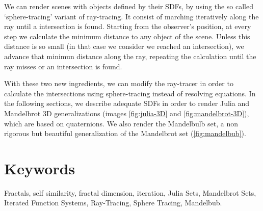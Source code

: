 We can render scenes with objects defined by their SDFs, by using the so called `sphere-tracing' variant of ray-tracing. It consist of marching iteratively along the ray until a intersection is found. Starting from the observer's position, at every step we calculate the minimum distance to any object of the scene. Unless this distance is so small (in that case we consider we reached an intersection), we advance that minimun distance along the ray, repeating the calculation until the ray misses or an intersection is found.

With these two new ingredients, we can modify the ray-tracer in order to calculate the intersections using sphere-tracing instead of resolving equations. In the following sections, we describe adequate SDFs in order to render Julia and Mandelbrot 3D generalizations (images \ref{fig:julia-3D} and \ref{fig:mandelbrot-3D}), which are based on quaternions. We also render the Mandelbulb set, a non rigorous but beautiful generalization of the Mandelbrot set (\ref{fig:mandelbub}).

\section*{Keywords}

Fractals, self similarity, fractal dimension, iteration, Julia Sets, Mandelbrot Sets, Iterated Function Systems, Ray-Tracing, Sphere Tracing, Mandelbub. 